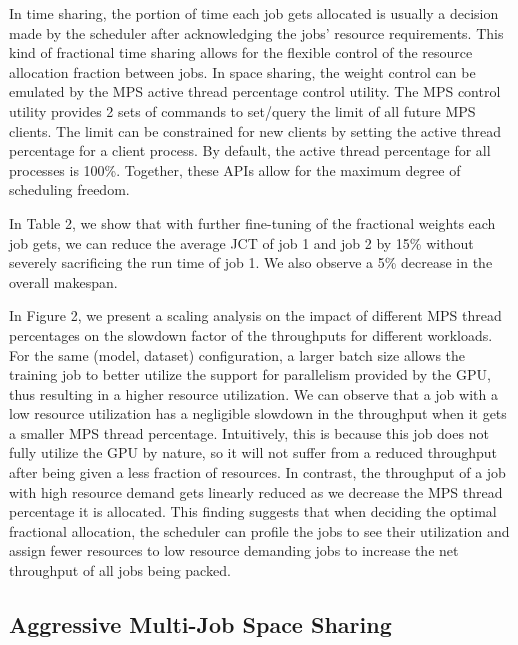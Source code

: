 \documentclass{article}
\begin{document}

In time sharing, the portion of time each job gets allocated is usually a decision made by the scheduler after acknowledging the jobs' resource requirements. This kind of fractional time sharing allows for the flexible control of the resource allocation fraction between jobs. In space sharing, the weight control can be emulated by the MPS active thread percentage control utility. The MPS control utility provides 2 sets of commands to set/query the limit of all future MPS clients. The limit can be constrained for new clients by setting the active thread percentage for a client process. By default, the active thread percentage for all processes is 100\%. Together, these APIs allow for the maximum degree of scheduling freedom.


In Table 2, we show that with further fine-tuning of the fractional weights each job gets, we can reduce the average JCT of job 1 and job 2 by 15\% without severely sacrificing the run time of job 1. We also observe a 5\% decrease in the overall makespan.


In Figure 2, we present a scaling analysis on the impact of different MPS thread percentages on the slowdown factor of the throughputs for different workloads. For the same (model, dataset) configuration, a larger batch size allows the training job to better utilize the support for parallelism provided by the GPU, thus resulting in a higher resource utilization. We can observe that a job with a low resource utilization has a negligible slowdown in the throughput when it gets a smaller MPS thread percentage. Intuitively, this is because this job does not fully utilize the GPU by nature, so it will not suffer from a reduced throughput after being given a less fraction of resources. In contrast, the throughput of a job with high resource demand gets linearly reduced as we decrease the MPS thread percentage it is allocated. This finding suggests that when deciding the optimal fractional allocation, the scheduler can profile the jobs to see their utilization and assign fewer resources to low resource demanding jobs to increase the net throughput of all jobs being packed.



\subsection{Aggressive Multi-Job Space Sharing}
\end{document}
